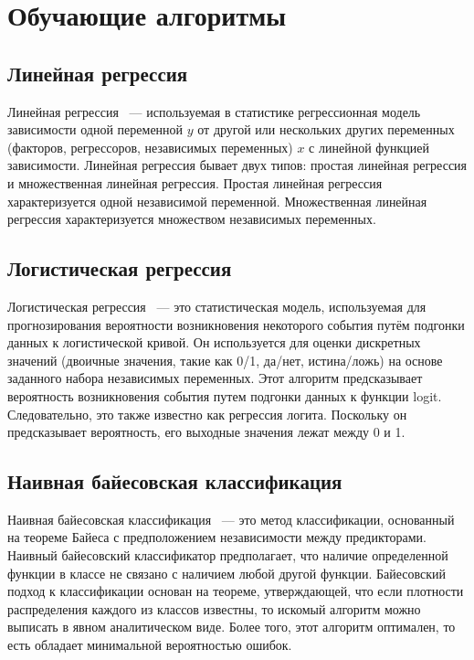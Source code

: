 \section{Обучающие алгоритмы}

\subsection*{Линейная регрессия} 
\indent \indent Линейная регрессия ~--- используемая в статистике регрессионная модель зависимости одной переменной $y$ от другой или нескольких других переменных (факторов, регрессоров, независимых переменных) $x$ с линейной функцией зависимости. Линейная регрессия бывает двух типов: простая линейная регрессия и множественная линейная регрессия. Простая линейная регрессия характеризуется одной независимой переменной. Множественная линейная регрессия характеризуется множеством независимых переменных.

\subsection*{Логистическая регрессия} 
\indent \indent Логистическая регрессия ~--- это статистическая модель, используемая для прогнозирования вероятности возникновения некоторого события путём подгонки данных к логистической кривой. Он используется для оценки дискретных значений (двоичные значения, такие как 0/1, да/нет, истина/ложь) на основе заданного набора независимых переменных. Этот алгоритм предсказывает вероятность возникновения события путем подгонки данных к функции logit. Следовательно, это также известно как регрессия логита. Поскольку он предсказывает вероятность, его выходные значения лежат между 0 и 1.

\subsection*{Наивная байесовская классификация}
\indent \indent Наивная байесовская классификация ~--- это метод классификации, основанный на  теореме Байеса с предположением независимости между предикторами. Наивный байесовский классификатор предполагает, что наличие определенной функции в классе не связано с наличием любой другой функции. Байесовский подход к классификации основан на теореме, утверждающей, что если плотности распределения каждого из классов известны, то искомый алгоритм можно выписать в явном аналитическом виде. Более того, этот алгоритм оптимален, то есть обладает минимальной вероятностью ошибок.
